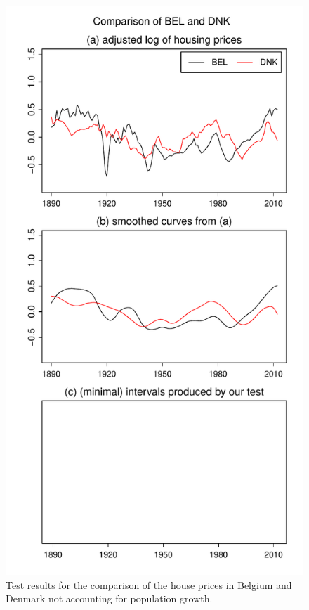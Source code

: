 \documentclass[a4paper,12pt]{article}
\begin{document}
\begin{enumerate}[label=\arabic*.,leftmargin=0.6cm]
\begin{figure}[t!]
\begin{minipage}[t]{0.48\textwidth}
\includegraphics[width=\textwidth]{../output/BEL_vs_DNK}
\caption{Test results for the comparison of the house prices in Belgium and Denmark not accounting for population growth.}\label{fig:hp:Belgium:Denmark}
\end{minipage}

\end{figure}
\end{enumerate}
\end{document}
